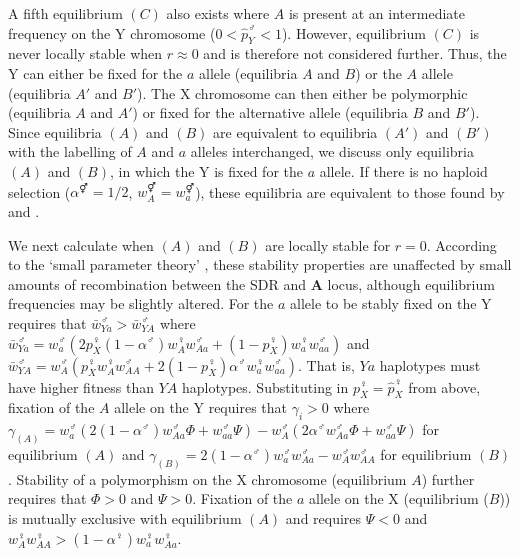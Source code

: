 \documentclass[12pt]{article}
\begin{document}
\noindent
A fifth equilibrium $(C)$ also exists where $A$ is present at an intermediate frequency on the Y chromosome ($0<\hat{p}_{Y}^{\male}<1$). However, equilibrium $(C)$ is never locally stable when $r \approx 0$ and is therefore not considered further. 
Thus, the Y can either be fixed for the $a$ allele (equilibria $A$ and $B$) or the $A$ allele (equilibria $A'$ and $B'$).
The X chromosome can then either be polymorphic (equilibria $A$ and $A'$) or fixed for the alternative allele (equilibria $B$ and $B'$).
Since equilibria $(A)$ and $(B)$ are equivalent to equilibria $(A')$ and $(B')$ with the labelling of $A$ and $a$ alleles interchanged, we discuss only equilibria $(A)$ and $(B)$, in which the Y is fixed for the $a$ allele. 
If there is no haploid selection ($\alpha^{\Hermaphrodite}=1/2$, $w_{A}^{\Hermaphrodite}=w_{a}^{\Hermaphrodite}$), these equilibria are equivalent to those found by \cite{Lloyd1977} and \cite{Otto2014}.

We next calculate when $(A)$ and $(B)$ are locally stable for $r=0$. According to the `small parameter theory' \citep{Karlin:1972ab,Karlin:1972dq}, these stability properties are unaffected by small amounts of recombination between the SDR and \textbf{A} locus, although equilibrium frequencies may be slightly altered. 
For the $a$ allele to be stably fixed on the Y requires that $\bar{w}_{Ya}^{\male}>\bar{w}_{YA}^{\male}$ where $\bar{w}_{Ya}^{\male}=w_{a}^{\male}(2 p_{X}^{\female}(1-\alpha^{\male}) w_{A}^{\female} w_{Aa}^{\male}+ (1-p_{X}^{\female})w_{a}^{\female} w_{aa}^{\male} )$ and $\bar{w}_{YA}^{\male}=w_{A}^{\male}(p_{X}^{\female} w_{A}^{\female} w_{AA}^{\male}+ 2 (1-p_{X}^{\female})\alpha^{\male}w_{a}^{\female} w_{aa}^{\male} )$. That is, $Ya$ haplotypes must have higher fitness than $YA$ haplotypes.  
Substituting in $p_{X}^{\female} = \hat{p}_{X}^{\female}$ from above, fixation of the $A$ allele on the Y requires that $\gamma_{i}>0$ where $\gamma_{(A)}=w_{a}^{\male}(2(1-\alpha^{\male})w_{Aa}^{\male} \Phi + w_{aa}^{\male} \Psi)-w_{A}^{\male}(2\alpha^{\male}w_{Aa}^{\male} \Phi + w_{aa}^{\male} \Psi)$ for equilibrium $(A)$ and $\gamma_{(B)}=2(1-\alpha^{\male})w_{a}^{\male}w_{Aa}^{\male}-w_{A}^{\male}w_{AA}^{\male}$ for equilibrium $(B)$.
Stability of a polymorphism on the X chromosome (equilibrium $A$) further requires that $\Phi >0$ and $\Psi >0$. 
Fixation of the $a$ allele on the X (equilibrium ($B$)) is mutually exclusive with equilibrium $(A)$ and requires $\Psi<0$ and $w_{A}^{\female}w_{AA}^{\female}>(1-\alpha^{\female})w_{a}^{\female}w_{Aa}^{\female}$. 
\end{document}
